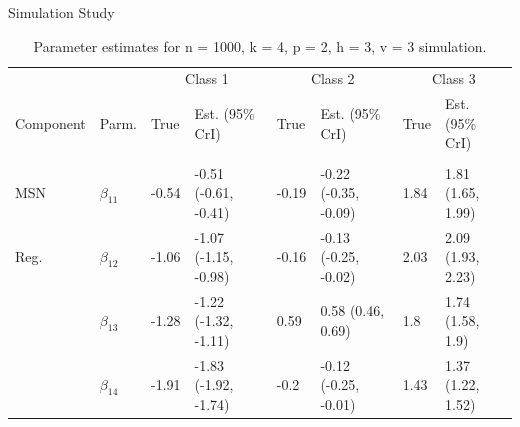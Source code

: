 \documentclass[final]{beamer}
\newlength{\onecolwid}
\newlength{\twocolwid}
\begin{document}
\begin{frame}[t]
\begin{columns}[t]
\begin{column}{\twocolwid}
\begin{columns}[t,totalwidth=\twocolwid]
\begin{column}{\onecolwid} %


\begin{block}{Simulation Study}

\begin{table}[t]

\caption{\label{tab:unnamed-chunk-4}Parameter estimates for n = 1000, k = 4, p = 2, h = 3, v = 3 simulation.}
\centering
\fontsize{20}{20}\selectfont
\begin{tabular}{llllllll}
\toprule
\multicolumn{2}{c}{ } & \multicolumn{2}{c}{Class 1} & \multicolumn{2}{c}{Class 2} & \multicolumn{2}{c}{Class 3} \\
\cmidrule(l{3pt}r{3pt}){3-4} \cmidrule(l{3pt}r{3pt}){5-6} \cmidrule(l{3pt}r{3pt}){7-8}
Component & Parm. & True & Est. (95\% CrI) & True & Est. (95\% CrI) & True & Est. (95\% CrI)\\
\midrule
\addlinespace[0.3em]
\multicolumn{8}{l}{\textbf{ }}\\
\hspace{1em}MSN & $\beta_{11}$ & -0.54 & -0.51 (-0.61, -0.41) & -0.19 & -0.22 (-0.35, -0.09) & 1.84 & 1.81 (1.65, 1.99)\\
\hspace{1em}Reg. & $\beta_{12}$ & -1.06 & -1.07 (-1.15, -0.98) & -0.16 & -0.13 (-0.25, -0.02) & 2.03 & 2.09 (1.93, 2.23)\\
\hspace{1em} & $\beta_{13}$ & -1.28 & -1.22 (-1.32, -1.11) & 0.59 & 0.58 (0.46, 0.69) & 1.8 & 1.74 (1.58, 1.9)\\
\hspace{1em} & $\beta_{14}$ & -1.91 & -1.83 (-1.92, -1.74) & -0.2 & -0.12 (-0.25, -0.01) & 1.43 & 1.37 (1.22, 1.52)\\


\end{tabular}
\end{table}
\end{block}
\end{column}
\end{columns}
\end{column}
\end{columns}
\end{frame}
\end{document}
